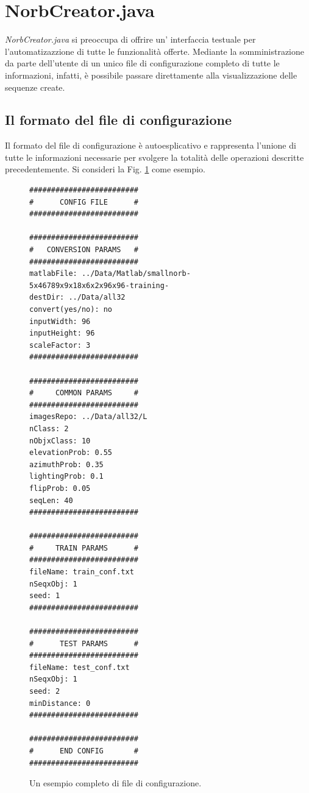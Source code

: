 \documentclass[paper=a4, fontsize=11pt]{scrartcl} %
\numberwithin{equation}{section} %
\numberwithin{figure}{section} %
\numberwithin{table}{section} %
\begin{document}
\section{NorbCreator.java}
\emph{NorbCreator.java} si preoccupa di offrire un' interfaccia testuale per l'automatizazzione di tutte le funzionalità offerte.
Mediante la somministrazione da parte dell'utente di un unico file di configurazione completo di tutte le informazioni, infatti, è possibile passare direttamente alla visualizzazione delle sequenze create.

\subsection{Il formato del file di configurazione}
Il formato del file di configurazione è autoesplicativo e rappresenta l'unione di tutte le informazioni necessarie per svolgere la totalità delle operazioni descritte precedentemente.
Si consideri la Fig. \ref{img:configfile} come esempio.

\begin{figure}[H]
\label{img:configfile}
\centering
\begin{BVerbatim}
#########################
#      CONFIG FILE      #
#########################

#########################
#   CONVERSION PARAMS   #
#########################
matlabFile: ../Data/Matlab/smallnorb-5x46789x9x18x6x2x96x96-training-
destDir: ../Data/all32
convert(yes/no): no
inputWidth: 96
inputHeight: 96
scaleFactor: 3
#########################

#########################
#     COMMON PARAMS     #
#########################
imagesRepo: ../Data/all32/L
nClass: 2
nObjxClass: 10
elevationProb: 0.55
azimuthProb: 0.35
lightingProb: 0.1
flipProb: 0.05
seqLen: 40
#########################

#########################
#     TRAIN PARAMS      #
#########################
fileName: train_conf.txt
nSeqxObj: 1
seed: 1
#########################

#########################
#      TEST PARAMS      #
#########################
fileName: test_conf.txt
nSeqxObj: 1
seed: 2
minDistance: 0
#########################

#########################
#      END CONFIG       #
#########################

\end{BVerbatim}
\caption{Un esempio completo di file di configurazione.}
\end{figure}
\end{document}
